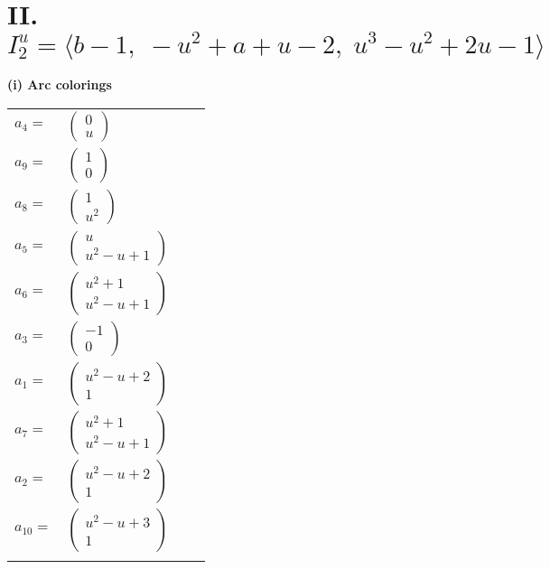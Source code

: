 \documentclass[1p]{elsarticle_modified}
\theoremstyle{definition}
\begin{document}
\centering \section*{II. $I^u_{2}= \langle b-1,\;- u^2+a+u-2,\;u^3- u^2+2 u-1 \rangle$}
\flushleft \textbf{(i) Arc colorings}\\
\begin{tabular}{m{7pt} m{180pt} m{7pt} m{180pt} }
\flushright $a_{4}=$&$\begin{pmatrix}0\\u\end{pmatrix}$ \\
\flushright $a_{9}=$&$\begin{pmatrix}1\\0\end{pmatrix}$ \\
\flushright $a_{8}=$&$\begin{pmatrix}1\\u^2\end{pmatrix}$ \\
\flushright $a_{5}=$&$\begin{pmatrix}u\\u^2- u+1\end{pmatrix}$ \\
\flushright $a_{6}=$&$\begin{pmatrix}u^2+1\\u^2- u+1\end{pmatrix}$ \\
\flushright $a_{3}=$&$\begin{pmatrix}-1\\0\end{pmatrix}$ \\
\flushright $a_{1}=$&$\begin{pmatrix}u^2- u+2\\1\end{pmatrix}$ \\
\flushright $a_{7}=$&$\begin{pmatrix}u^2+1\\u^2- u+1\end{pmatrix}$ \\
\flushright $a_{2}=$&$\begin{pmatrix}u^2- u+2\\1\end{pmatrix}$ \\
\flushright $a_{10}=$&$\begin{pmatrix}u^2- u+3\\1\end{pmatrix}$\\&\end{tabular}
\end{document}
